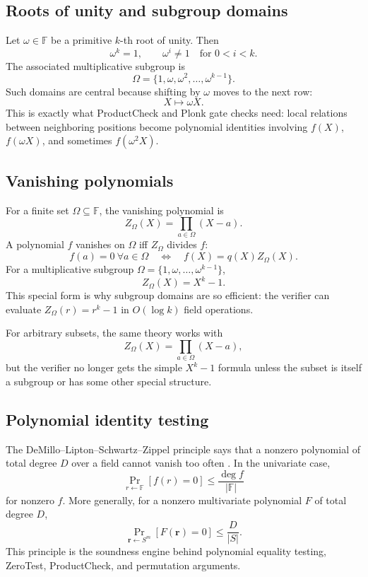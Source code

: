 \documentclass[11pt]{article}
\newcommand{\F}{\mathbb{F}}
\begin{document}
\subsection{Roots of unity and subgroup domains}

Let $\omega\in\F$ be a primitive $k$-th root of unity. Then
\[
    \omega^k=1,
    \qquad
    \omega^i\neq 1\quad\text{for }0<i<k.
\]
The associated multiplicative subgroup is
\[
    \Omega=\{1,\omega,\omega^2,\ldots,\omega^{k-1}\}.
\]
Such domains are central because shifting by $\omega$ moves to the next row:
\[
    X\mapsto \omega X.
\]
This is exactly what ProductCheck and Plonk gate checks need: local relations between neighboring positions become polynomial identities involving $f(X)$, $f(\omega X)$, and sometimes $f(\omega^2X)$.

\subsection{Vanishing polynomials}

For a finite set $\Omega\subseteq\F$, the vanishing polynomial is
\[
    Z_\Omega(X)=\prod_{a\in\Omega}(X-a).
\]
A polynomial $f$ vanishes on $\Omega$ iff $Z_\Omega$ divides $f$:
\[
    f(a)=0\ \forall a\in\Omega
    \quad\Longleftrightarrow\quad
    f(X)=q(X)Z_\Omega(X).
\]
For a multiplicative subgroup $\Omega=\{1,\omega,\ldots,\omega^{k-1}\}$,
\[
    Z_\Omega(X)=X^k-1.
\]
This special form is why subgroup domains are so efficient: the verifier can evaluate $Z_\Omega(r)=r^k-1$ in $O(\log k)$ field operations.

For arbitrary subsets, the same theory works with
\[
    Z_\Omega(X)=\prod_{a\in\Omega}(X-a),
\]
but the verifier no longer gets the simple $X^k-1$ formula unless the subset is itself a subgroup or has some other special structure.

\subsection{Polynomial identity testing}

The DeMillo--Lipton--Schwartz--Zippel principle says that a nonzero polynomial of total degree $D$ over a field cannot vanish too often \cite{DeMilloLipton1978,Schwartz1980,Zippel1979}. In the univariate case,
\[
    \Pr_{r\leftarrow \F}[f(r)=0]\le \frac{\deg f}{|\F|}
\]
for nonzero $f$. More generally, for a nonzero multivariate polynomial $F$ of total degree $D$,
\[
    \Pr_{\mathbf r\leftarrow S^m}[F(\mathbf r)=0]\le \frac{D}{|S|}.
\]
This principle is the soundness engine behind polynomial equality testing, ZeroTest, ProductCheck, and permutation arguments.
\end{document}
